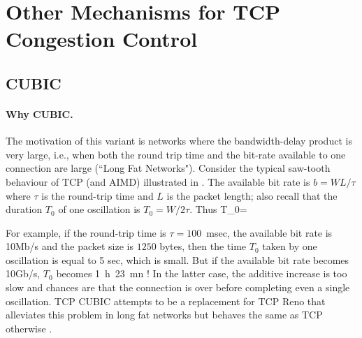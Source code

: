 %
%
%
%
%
%
%
%
%
%
%
%
%
%

\section{Other Mechanisms for TCP Congestion Control}
\subsection{CUBIC}
\paragraph{Why CUBIC.}
The motivation of this variant is networks where the bandwidth-delay product is very large, i.e., when both the round trip time and the bit-rate available to one connection are large (``Long Fat Networks"). Consider the typical saw-tooth behaviour of TCP (and AIMD) illustrated in . The available bit rate is $b=WL/\tau$ where $\tau$ is the round-trip time and $L$ is the packet length; also recall that the duration $T_0$ of one oscillation is  $T_0=W/2 \tau$. Thus
\ben T_0=  
\een

For example,  if the round-trip time is $\tau=100$~msec, the available bit rate is 10Mb/s and the packet size is $1250$ bytes, then the time $T_0$  taken by one oscillation is equal to 5 sec, which is small. But if the available bit rate becomes 10Gb/s, $T_0$  becomes 1~h~23~mn ! In the latter case, the additive increase is too slow and chances are that the connection is over before completing even a single oscillation.  TCP CUBIC attempts to be a replacement for TCP Reno that alleviates this problem in long fat networks but behaves the same as TCP otherwise \cite{ha2008cubic, cubic2018rfc}.

